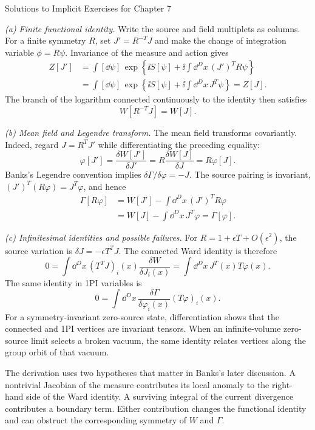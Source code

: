 \begin{bankssolutions}{Solutions to Implicit Exercises for Chapter 7}

\textit{(a) Finite functional identity.}
Write the source and field multiplets as columns.  For a finite symmetry
$R$, set $J'=R^{-T}J$ and make the change of integration variable
$\phi=R\psi$.  Invariance of the measure and action gives
\begin{align*}
 Z[J']
 &=\int[\dd\psi]\,
 \exp\left\{\ii S[\psi]
 +\ii\int\dd^D x\,(J')^TR\psi\right\}\\
 &=\int[\dd\psi]\,
 \exp\left\{\ii S[\psi]
 +\ii\int\dd^D x\,J^T\psi\right\}=Z[J].
\end{align*}
The branch of the logarithm connected continuously to the identity then
satisfies
\[
 W[R^{-T}J]=W[J].
\]

\textit{(b) Mean field and Legendre transform.}
The mean field transforms covariantly.  Indeed, regard
$J=R^TJ'$ while differentiating the preceding equality:
\[
 \varphi[J']
 =\frac{\delta W[J']}{\delta J'}
 =R\frac{\delta W[J]}{\delta J}
 =R\varphi[J].
\]
Banks's Legendre convention implies
$\delta\Gamma/\delta\varphi=-J$.  The source pairing is invariant,
$(J')^T(R\varphi)=J^T\varphi$, and hence
\begin{align*}
 \Gamma[R\varphi]
 &=W[J']-\int\dd^D x\,(J')^TR\varphi\\
 &=W[J]-\int\dd^D x\,J^T\varphi
 =\Gamma[\varphi].
\end{align*}

\textit{(c) Infinitesimal identities and possible failures.}
For $R=1+\epsilon T+O(\epsilon^2)$, the source variation is
$\delta J=-\epsilon T^TJ$.  The connected Ward identity is therefore
\[
 0=\int\dd^D x\,
 (T^TJ)_i(x)\frac{\delta W}{\delta J_i(x)}
 =\int\dd^D x\,J^T(x)T\varphi(x).
\]
The same identity in 1PI variables is
\[
 0=\int\dd^D x\,
 \frac{\delta\Gamma}{\delta\varphi_i(x)}(T\varphi)_i(x).
\]
For a symmetry-invariant zero-source state, differentiation shows that the
connected and 1PI vertices are invariant tensors.  When an infinite-volume
zero-source limit selects a broken vacuum, the same identity relates vertices
along the group orbit of that vacuum.

The derivation uses two hypotheses that matter in Banks's later discussion.
A nontrivial Jacobian of the measure contributes its local anomaly to the
right-hand side of the Ward identity.  A surviving integral of the current
divergence contributes a boundary term.  Either contribution changes the
functional identity and can obstruct the corresponding symmetry of $W$ and
$\Gamma$.


\end{bankssolutions}
